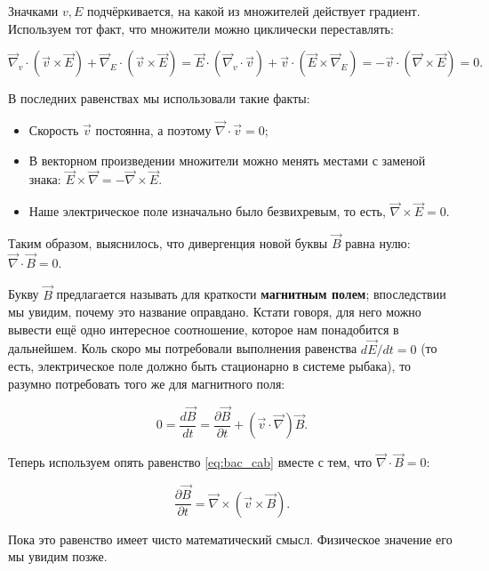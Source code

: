 \documentclass[a4paper,12pt]{article}
\newcommand{\pt}{\partial}
\newcommand{\vn}{\vec{\nabla}}
\begin{document}
Значками $v,E$ подчёркивается, на какой из множителей действует
градиент. Используем тот факт, что множители можно циклически
переставлять: 

\begin{equation}
  \label{eq:nabla_eq_2}
  \vn_v \cdot \left(
    \vec{v} \times \vec{E} \right)  + \vn_E \cdot \left( \vec{v} \times
    \vec{E} \right) = \vec{E} \cdot \left( \vn_v \cdot \vec{v} \right) +
  \vec{v} \cdot \left( \vec{E} \times \vn_E \right) = -\vec{v} \cdot
  \left( \vn \times \vec{E} \right) =0.
\end{equation}

В последних равенствах мы использовали такие факты: 

\begin{itemize}
\item Скорость $\vec{v}$ постоянна, а поэтому $\vn \cdot \vec{v} =0$;
\item В векторном произведении множители можно менять местами с
  заменой знака: $\vec{E} \times \vn = - \vn \times \vec{E}$.
\item Наше электрическое поле изначально было безвихревым, то есть,
  $\vn \times \vec{E}=0$.
\end{itemize}

Таким образом, выяснилось, что дивергенция новой буквы $\vec{B}$ равна
нулю: $\vn \cdot \vec{B}=0$.

Букву $\vec{B}$ предлагается называть для краткости \textbf{магнитным
  полем}; впоследствии мы увидим, почему это название
оправдано. Кстати говоря, для него можно вывести ещё одно интересное
соотношение, которое нам понадобится в дальнейшем. Коль скоро мы
потребовали выполнения равенства $d\vec{E}/dt=0$ (то есть, электрическое
поле должно быть стационарно в системе рыбака), то разумно потребовать
того же для магнитного поля:

\begin{equation}
  \label{eq:db/dt_1}
  0=\frac{d\vec{B}}{dt} = \frac{\pt \vec{B}}{\pt t} + \left( \vec{v}
    \cdot \vn \right) \vec{B}.
\end{equation}

Теперь используем опять равенство \eqref{eq:bac_cab} вместе с тем, что
$\vn \cdot \vec{B}=0$: 

\begin{equation}
  \label{eq:db/dt_2}
  \frac{\pt \vec{B}}{\pt t} = \vn \times \left( \vec{v} \times \vec{B}  \right).
\end{equation}

Пока это равенство имеет чисто математический смысл. Физическое
значение его мы увидим позже. 
\end{document}
